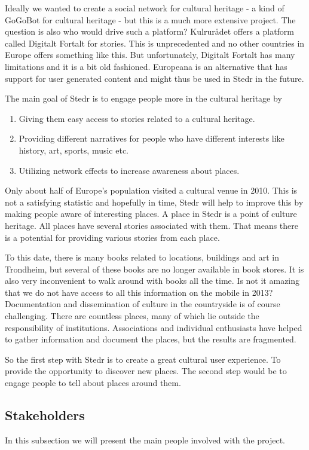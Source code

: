 Ideally we wanted to create a social network for cultural heritage - a kind of GoGoBot for cultural heritage - but this is a much more extensive project. The question is also who would drive such a platform? Kulrurådet offers a platform called Digitalt Fortalt for stories. This is unprecedented and no other countries in Europe offers something like this. But unfortunately, Digitalt Fortalt has many limitations and it is a bit old fashioned. Europeana is an alternative that has support for user generated content and might thus be used in Stedr in the future.

The main goal of Stedr is to engage people more in the cultural heritage by
\begin{enumerate}
\item Giving them easy access to stories related to a cultural heritage. \item Providing different narratives for people who have different interests like history, art, sports, music etc. \item Utilizing network effects to increase awareness about places.
\end{enumerate}

Only about half of Europe's population visited a cultural venue in 2010. This is not a satisfying statistic and hopefully in time, Stedr will help to improve this by making people aware of interesting places. A place in Stedr is a point of culture heritage. All places have several stories associated with them. That means there is a potential for providing various stories from each place.

To this date, there is many books related to locations, buildings and art in Trondheim, but several of these books are no longer available in book stores. It is also very inconvenient to walk around with books all the time. Is not it amazing that we do not have access to all this information on the mobile in 2013? Documentation and dissemination of culture in the countryside is of course challenging. There are countless places, many of which lie outside the responsibility of institutions. Associations and individual enthusiasts have helped to gather information and document the places, but the results are fragmented.

So the first step with Stedr is to create a great cultural user experience. To provide the opportunity to discover new places. The second step would be to engage people to tell about places around them.

\subsection{Stakeholders}
In this subsection we will present the main people involved with the project. 

